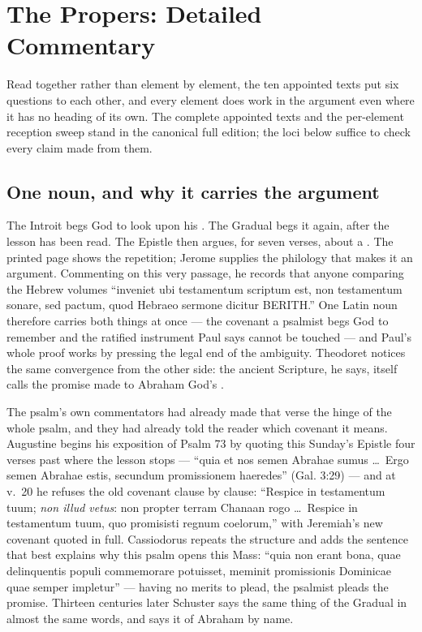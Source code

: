 \sectionguard
\section*{The Propers: Detailed Commentary}

Read together rather than element by element, the ten appointed texts put
six questions to each other, and every element does work in the argument even
where it has no heading of its own. The complete appointed texts and the
per-element reception sweep stand in the canonical full edition; the loci
below suffice to check every claim made from them.

\subsection*{One noun, and why it carries the argument}

The Introit begs God to look upon his . The Gradual begs it
again, after the lesson has been read. The Epistle then argues, for seven
verses, about a . The printed page shows
the repetition; Jerome supplies the philology that makes it an argument.
Commenting on this very passage, he
records that anyone comparing the Hebrew volumes ``inveniet ubi testamentum
scriptum est, non testamentum sonare, sed pactum, quod Hebraeo sermone dicitur
BERITH.'' One Latin noun therefore carries both things at once --- the covenant
a psalmist begs God to remember and the ratified instrument Paul says cannot be
touched --- and Paul's whole proof works by pressing the legal end of the
ambiguity. Theodoret notices the same convergence from the other side: the
ancient Scripture, he says, itself calls the promise made to Abraham God's
.

The psalm's own commentators had already made that verse the hinge of the whole
psalm, and they had already told the reader which covenant it means. Augustine
begins his exposition of Psalm 73 by quoting this Sunday's Epistle four verses
past where the lesson stops --- ``quia et nos semen Abrahae sumus \dots\ Ergo
semen Abrahae estis, secundum promissionem haeredes'' (Gal. 3:29) --- and at
v.~20 he refuses the old covenant clause by clause: ``Respice in testamentum
tuum; \emph{non illud vetus}: non propter terram Chanaan rogo \dots\ Respice in
testamentum tuum, quo promisisti regnum coelorum,'' with Jeremiah's new covenant
quoted in full. Cassiodorus repeats the structure and adds the sentence that
best explains why this psalm opens this Mass: ``quia non erant bona, quae
delinquentis populi commemorare potuisset, meminit promissionis Dominicae quae
semper impletur'' --- having no merits to plead, the psalmist pleads the
promise. Thirteen centuries later Schuster says the same thing of the Gradual
in almost the same words, and says it of Abraham by name.

